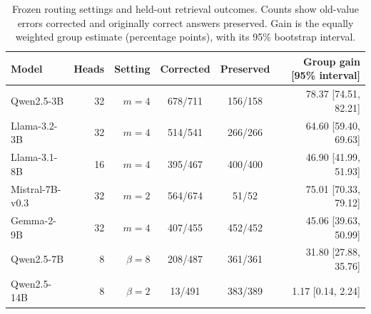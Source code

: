 \begin{table}[htbp]
\centering
\footnotesize
\setlength{\tabcolsep}{4pt}
\caption{Frozen routing settings and held-out retrieval outcomes. Counts show
old-value errors corrected and originally correct answers preserved.
Gain is the equally weighted group estimate (percentage points), with its
95\% bootstrap interval.}
\label{tab:repair-estimates}
\begin{tabular}{@{}lrrccr@{}}
\toprule
Model & Heads & Setting & Corrected & Preserved & Group gain [95\% interval] \\
\midrule
Qwen2.5-3B & 32 & $m=4$ & 678/711 & 156/158 & 78.37 [74.51, 82.21] \\
Llama-3.2-3B & 32 & $m=4$ & 514/541 & 266/266 & 64.60 [59.40, 69.63] \\
Llama-3.1-8B & 16 & $m=4$ & 395/467 & 400/400 & 46.90 [41.99, 51.93] \\
Mistral-7B-v0.3 & 32 & $m=2$ & 564/674 & 51/52 & 75.01 [70.33, 79.12] \\
Gemma-2-9B & 32 & $m=4$ & 407/455 & 452/452 & 45.06 [39.63, 50.99] \\
\addlinespace[2pt]
Qwen2.5-7B & 8 & $\beta=8$ & 208/487 & 361/361 & 31.80 [27.88, 35.76] \\
Qwen2.5-14B & 8 & $\beta=2$ & 13/491 & 383/389 & 1.17 [0.14, 2.24] \\
\bottomrule
\end{tabular}
\end{table}
